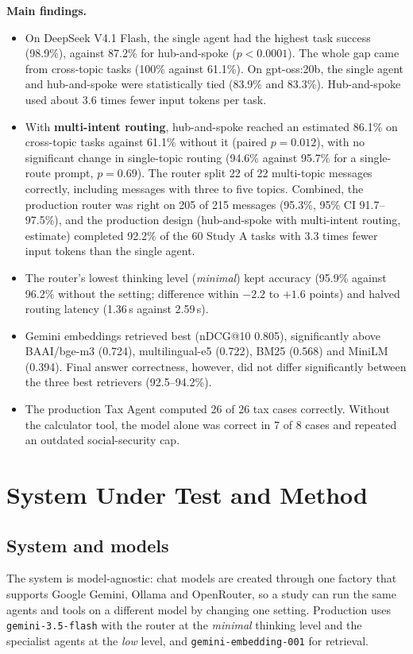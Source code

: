 \documentclass[11pt,a4paper]{article}
\begin{document}
\textbf{Main findings.}
\begin{itemize}
\item On DeepSeek V4.1 Flash, the single agent had the highest task success (98.9\%), against 87.2\% for hub-and-spoke ($p<0.0001$). The whole gap came from cross-topic tasks (100\% against 61.1\%). On gpt-oss:20b, the single agent and hub-and-spoke were statistically tied (83.9\% and 83.3\%). Hub-and-spoke used about 3.6 times fewer input tokens per task.
\item With \textbf{multi-intent routing}, hub-and-spoke reached an estimated 86.1\% on cross-topic tasks against 61.1\% without it (paired $p=0.012$), with no significant change in single-topic routing (94.6\% against 95.7\% for a single-route prompt, $p=0.69$). The router split 22 of 22 multi-topic messages correctly, including messages with three to five topics. Combined, the production router was right on 205 of 215 messages (95.3\%, 95\% CI 91.7--97.5\%), and the production design (hub-and-spoke with multi-intent routing, estimate) completed 92.2\% of the 60 Study A tasks with 3.3 times fewer input tokens than the single agent.
\item The router's lowest thinking level (\emph{minimal}) kept accuracy (95.9\% against 96.2\% without the setting; difference within $-2.2$ to $+1.6$ points) and halved routing latency (1.36\,s against 2.59\,s).
\item Gemini embeddings retrieved best (nDCG@10 0.805), significantly above BAAI/bge-m3 (0.724), multilingual-e5 (0.722), BM25 (0.568) and MiniLM (0.394). Final answer correctness, however, did not differ significantly between the three best retrievers (92.5--94.2\%).
\item The production Tax Agent computed 26 of 26 tax cases correctly. Without the calculator tool, the model alone was correct in 7 of 8 cases and repeated an outdated social-security cap.
\end{itemize}

\section{System Under Test and Method}

\subsection{System and models}
The system is model-agnostic: chat models are created through one factory that supports Google Gemini, Ollama and OpenRouter, so a study can run the same agents and tools on a different model by changing one setting. Production uses \texttt{gemini-3.5-flash} with the router at the \emph{minimal} thinking level and the specialist agents at the \emph{low} level, and \texttt{gemini-embedding-001} for retrieval.
\end{document}
